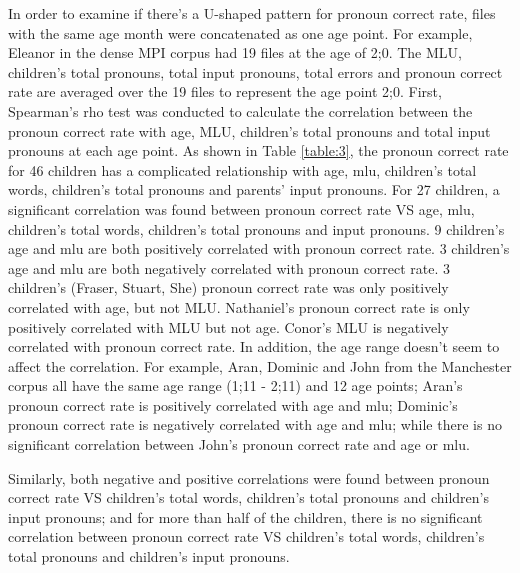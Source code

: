 In order to examine if there's a U-shaped pattern for pronoun correct rate, files with the same age month were concatenated as one age point. For example, Eleanor in the dense MPI corpus \citep{rowland2006effect} had 19 files at the age of 2;0. The MLU, children's total pronouns, total input pronouns, total errors and pronoun correct rate are averaged over the 19 files to represent the age point 2;0. First, Spearman's rho test was conducted to calculate the correlation between the pronoun correct rate with age, MLU, children's total pronouns and total input pronouns at each age point. As shown in Table \ref{table:3}, the pronoun correct rate for 46 children has a complicated relationship with age, mlu, children's total words, children's total pronouns and parents' input pronouns. For 27 children, a significant correlation was found between pronoun correct rate VS age, mlu, children's total words, children's total pronouns and input pronouns. 9 children's age and mlu are both positively correlated with pronoun correct rate. 3 children's age and mlu are both negatively correlated with pronoun correct rate. 
3 children's (Fraser, Stuart, She) pronoun correct rate was only positively correlated with age, but not MLU. Nathaniel's pronoun correct rate is only positively correlated with MLU but not age. Conor's MLU is negatively correlated with pronoun correct rate. In addition, the age range doesn't seem to affect the correlation. For example, Aran, Dominic and John from the Manchester corpus \citep{theakston2001} all have the same age range (1;11 - 2;11) and 12 age points; Aran's pronoun correct rate is positively correlated with age and mlu; Dominic's pronoun correct rate is negatively correlated with age and mlu; while there is no significant correlation between John's pronoun correct rate and age or mlu. 

Similarly, both negative and positive correlations were found between pronoun correct rate VS children's total words, children's total pronouns and children's input pronouns; and for more than half of the children, there is no significant correlation between pronoun correct rate VS children's total words, children's total pronouns and children's input pronouns. 

